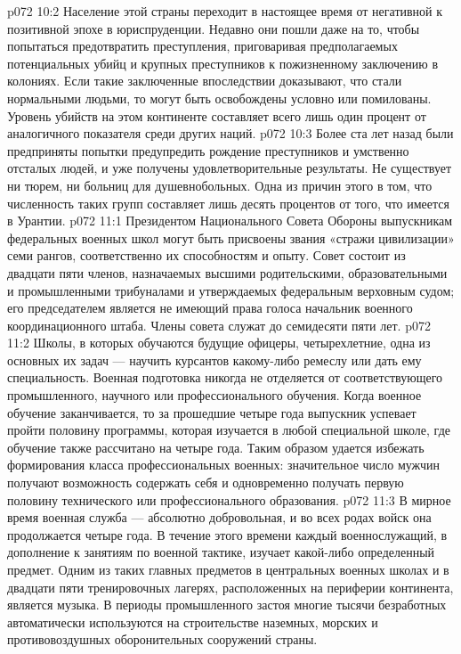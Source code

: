 \vs p072 10:2 Население этой страны переходит в настоящее время от негативной к позитивной эпохе в юриспруденции. Недавно они пошли даже на то, чтобы попытаться предотвратить преступления, приговаривая предполагаемых потенциальных убийц и крупных преступников к пожизненному заключению в колониях. Если такие заключенные впоследствии доказывают, что стали нормальными людьми, то могут быть освобождены условно или помилованы. Уровень убийств на этом континенте составляет всего лишь один процент от аналогичного показателя среди других наций.
\vs p072 10:3 Более ста лет назад были предприняты попытки предупредить рождение преступников и умственно отсталых людей, и уже получены удовлетворительные результаты. Не существует ни тюрем, ни больниц для душевнобольных. Одна из причин этого в том, что численность таких групп составляет лишь десять процентов от того, что имеется в Урантии.
\vs p072 11:1 Президентом Национального Совета Обороны выпускникам федеральных военных школ могут быть присвоены звания «стражи цивилизации» семи рангов, соответственно их способностям и опыту. Совет состоит из двадцати пяти членов, назначаемых высшими родительскими, образовательными и промышленными трибуналами и утверждаемых федеральным верховным судом; его председателем является не имеющий права голоса начальник военного координационного штаба. Члены совета служат до семидесяти пяти лет.
\vs p072 11:2 Школы, в которых обучаются будущие офицеры, четырехлетние, одна из основных их задач --- научить курсантов какому\hyp{}либо ремеслу или дать ему специальность. Военная подготовка никогда не отделяется от соответствующего промышленного, научного или профессионального обучения. Когда военное обучение заканчивается, то за прошедшие четыре года выпускник успевает пройти половину программы, которая изучается в любой специальной школе, где обучение также рассчитано на четыре года. Таким образом удается избежать формирования класса профессиональных военных: значительное число мужчин получают возможность содержать себя и одновременно получать первую половину технического или профессионального образования.
\vs p072 11:3 В мирное время военная служба --- абсолютно добровольная, и во всех родах войск она продолжается четыре года. В течение этого времени каждый военнослужащий, в дополнение к занятиям по военной тактике, изучает какой\hyp{}либо определенный предмет. Одним из таких главных предметов в центральных военных школах и в двадцати пяти тренировочных лагерях, расположенных на периферии континента, является музыка. В периоды промышленного застоя многие тысячи безработных автоматически используются на строительстве наземных, морских и противовоздушных оборонительных сооружений страны.
